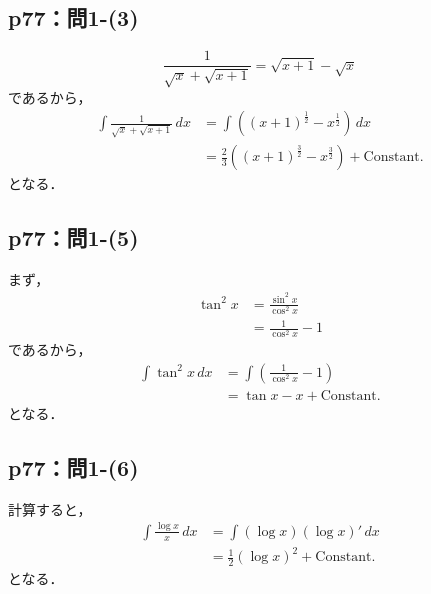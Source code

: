\documentclass[uplatex,dvipdfmx,a4paper,10pt,fleqn]{jsarticle}
\begin{document}
\subsection*{p77：問1-(3)}

\begin{tleftbar}
    \[
        \frac{1}{\sqrt{x}+\sqrt{x+1}} = \sqrt{x+1}-\sqrt{x}
    \]
    であるから，
    \begin{align*} 
        \int \frac{1}{\sqrt{x}+\sqrt{x+1}} \, dx & = \int ( (x+1)^\frac{1}{2} -x^\frac{1}{2} ) \, dx \\
        & = \frac{2}{3} ( (x+1)^\frac{3}{2} - x^\frac{3}{2} ) + \mathrm{Constant.}
    \end{align*} 
    となる．
\end{tleftbar}


\subsection*{p77：問1-(5)}

\begin{tleftbar}
    まず，
    \begin{align*} 
        \tan ^2 x &= \frac{\sin^2 x}{\cos ^2 x} \\
        & = \frac{1}{\cos ^2 x}-1
    \end{align*} 
    であるから，
    \begin{align*} 
        \int \tan ^2 x \, dx & = \int \left (  \frac{1}{\cos ^2 x}-1 \right) \\
        & = \tan x -x +\mathrm{Constant.}
    \end{align*} 
    となる．
\end{tleftbar}

\subsection*{p77：問1-(6)}

\begin{tleftbar}
    計算すると，
    \begin{align*} 
        \int \frac{\log x}{x} \, dx & =\int (\log x) (\log x)' \, dx \\
        & = \frac{1}{2} (\log x)^2 + \mathrm{Constant.}
    \end{align*} 
    となる．
\end{tleftbar}
\end{document}
